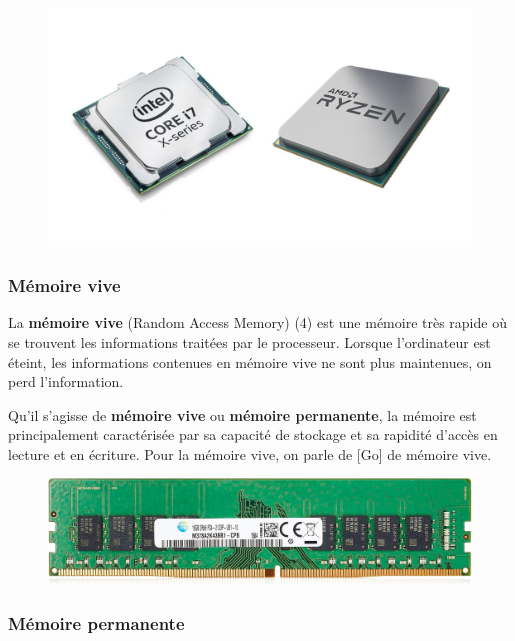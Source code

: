 \documentclass[11pt, a4paper]{book}
\begin{document}
\begin{figure}[h]
	\centering
	\includegraphics[scale=.15]{images/processeur}

\end{figure}


\subsubsection{Mémoire vive}

La {\bf mémoire vive} (Random Access Memory) (4) est une mémoire très rapide où se trouvent les informations traitées par le processeur. Lorsque l'ordinateur est éteint, les informations contenues en mémoire vive ne sont plus maintenues, on perd l'information.

Qu'il s'agisse de {\bf mémoire vive} ou {\bf mémoire permanente}, la mémoire est principalement caractérisée par sa capacité de stockage et sa rapidité d'accès en lecture et en écriture. 
Pour la mémoire vive, on parle de [Go] de mémoire vive.

\begin{figure}[h]
	\centering
	\includegraphics[scale=.3]{images/sdram}

\end{figure}

\subsubsection{Mémoire permanente}
\end{document}
